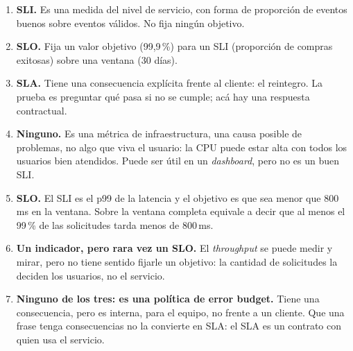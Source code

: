 \documentclass[variant=guia,cover=institutional,mode=screen]{ua-engineering-v6-article}
\begin{document}
\begin{uaanswer}
\begin{enumerate}
\item \textbf{SLI.} Es una medida del nivel de servicio, con forma de proporción de eventos buenos sobre eventos válidos. No fija ningún objetivo.
\item \textbf{SLO.} Fija un valor objetivo (99,9\,\%) para un SLI (proporción de compras exitosas) sobre una ventana (30 días).
\item \textbf{SLA.} Tiene una consecuencia explícita frente al cliente: el reintegro. La prueba es preguntar qué pasa si no se cumple; acá hay una respuesta contractual.
\item \textbf{Ninguno.} Es una métrica de infraestructura, una causa posible de problemas, no algo que viva el usuario: la CPU puede estar alta con todos los usuarios bien atendidos. Puede ser útil en un \emph{dashboard}, pero no es un buen SLI.
\item \textbf{SLO.} El SLI es el p99 de la latencia y el objetivo es que sea menor que 800\,ms en la ventana. Sobre la ventana completa equivale a decir que al menos el 99\,\% de las solicitudes tarda menos de 800\,ms.
\item \textbf{Un indicador, pero rara vez un SLO.} El \emph{throughput} se puede medir y mirar, pero no tiene sentido fijarle un objetivo: la cantidad de solicitudes la deciden los usuarios, no el servicio.
\item \textbf{Ninguno de los tres: es una política de error budget.} Tiene una consecuencia, pero es interna, para el equipo, no frente a un cliente. Que una frase tenga consecuencias no la convierte en SLA: el SLA es un contrato con quien usa el servicio.
\end{enumerate}
\end{uaanswer}
\end{document}
